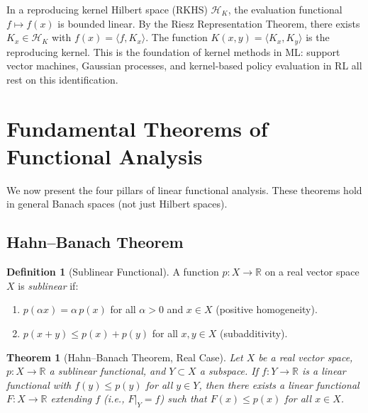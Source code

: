 \documentclass[11pt,a4paper]{article}
\theoremstyle{definition}
\newtheorem{definition}{Definition}[section]
\theoremstyle{plain}
\newtheorem{theorem}{Theorem}[section]
\theoremstyle{remark}
\newcommand{\R}{\mathbb{R}}
\begin{document}
\begin{rlconnection}
In a reproducing kernel Hilbert space (RKHS) $\mathcal{H}_K$, the evaluation
functional $f \mapsto f(x)$ is bounded linear. By the Riesz Representation
Theorem, there exists $K_x \in \mathcal{H}_K$ with $f(x) = \langle f, K_x \rangle$.
The function $K(x, y) = \langle K_x, K_y \rangle$ is the reproducing kernel.
This is the foundation of kernel methods in ML: support vector machines,
Gaussian processes, and kernel-based policy evaluation in RL all rest on
this identification.
\end{rlconnection}


\section{Fundamental Theorems of Functional Analysis}\label{sec:fundamental}

We now present the four pillars of linear functional analysis. These theorems
hold in general Banach spaces (not just Hilbert spaces).

\subsection{Hahn--Banach Theorem}

\begin{definition}[Sublinear Functional]\label{def:sublinear}
A function $p \colon X \to \R$ on a real vector space $X$ is \emph{sublinear} if:
\begin{enumerate}[label=(\roman*)]
    \item $p(\alpha x) = \alpha\, p(x)$ for all $\alpha > 0$ and $x \in X$
          (positive homogeneity).
    \item $p(x + y) \leq p(x) + p(y)$ for all $x, y \in X$ (subadditivity).
\end{enumerate}
\end{definition}

\begin{theorem}[Hahn--Banach Theorem, Real Case]\label{thm:hahn-banach}
Let $X$ be a real vector space, $p \colon X \to \R$ a sublinear functional,
and $Y \subset X$ a subspace. If $f \colon Y \to \R$ is a linear functional
with $f(y) \leq p(y)$ for all $y \in Y$, then there exists a linear functional
$F \colon X \to \R$ extending $f$ (i.e., $F|_Y = f$) such that
$F(x) \leq p(x)$ for all $x \in X$.
\end{theorem}
\end{document}

